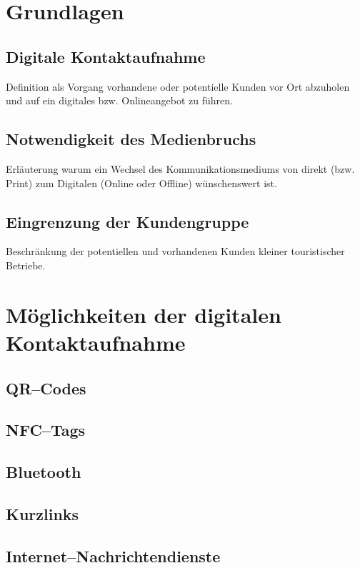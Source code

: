 \section{Grundlagen}
\label{sec:grundlagen}

\subsection{Digitale Kontaktaufnahme}

Definition als Vorgang vorhandene oder potentielle
Kunden vor Ort abzuholen und auf ein digitales bzw. Onlineangebot zu
führen.

\subsection{Notwendigkeit des Medienbruchs}

Erläuterung warum ein Wechsel des Kommunikationsmediums von direkt (bzw. Print) zum Digitalen (Online oder Offline) wünschenswert ist.

\subsection{Eingrenzung der Kundengruppe}

Beschränkung der potentiellen und vorhandenen Kunden kleiner touristischer Betriebe.

\section{Möglichkeiten der digitalen Kontaktaufnahme}

\subsection{QR–Codes}
\subsection{NFC--Tags}
\subsection{Bluetooth}
\subsection{Kurzlinks}
\subsection{Internet--Nachrichtendienste}

